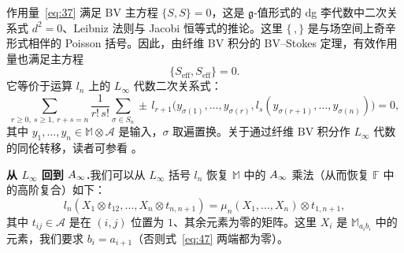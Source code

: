 作用量~\eqref{eq:37} 满足 BV 主方程 $\{S,S\}=0$，这是 $\mathfrak g$-值形式的 dg 李代数中二次关系式 $d^2=0$、Leibniz 法则与 Jacobi 恒等式的推论。这里 $\{\,,\}$ 是与场空间上奇辛形式相伴的 Poisson 括号。因此，由纤维 BV 积分的 BV--Stokes 定理，有效作用量也满足主方程
\begin{equation}\tag{45}\label{eq:45}
\{S_{\mathrm{eff}},S_{\mathrm{eff}}\}=0.
\end{equation}
它等价于运算 $l_n$ 上的 $L_\infty$ 代数二次关系式：
\begin{equation}\tag{46}\label{eq:46}
\sum_{r\ge0,\ s\ge1,\ r+s=n}\frac{1}{r!\,s!}\sum_{\sigma\in S_n}
\pm\,l_{r+1}\bigl(y_{\sigma(1)},\dots,y_{\sigma(r)},l_s(y_{\sigma(r+1)},\dots,y_{\sigma(n)})\bigr)=0,
\end{equation}
其中 $y_1,\dots,y_n\in\mathbb{M}\otimes\mathcal A$ 是输入，$\sigma$ 取遍置换。关于通过纤维 BV 积分作 $L_\infty$ 代数的同伦转移，读者可参看 \cite{mnev}。


\textbf{从 $L_\infty$ 回到 $A_\infty$.}\quad 我们可以从 $L_\infty$ 括号 $l_n$ 恢复 $\mathbb{M}$ 中的 $A_\infty$ 乘法（从而恢复 $\mathbb{F}$ 中的高阶复合）如下：
\begin{equation}\tag{47}\label{eq:47}
l_n(X_1\otimes t_{12},\dots,X_n\otimes t_{n,n+1})=\mu_n(X_1,\dots,X_n)\otimes t_{1,n+1},
\end{equation}
其中 $t_{ij}\in\mathcal A$ 是在 $(i,j)$ 位置为 $1$、其余元素为零的矩阵。这里 $X_i$ 是 $\mathbb{M}_{a_ib_i}$ 中的元素，我们要求 $b_i=a_{i+1}$（否则式~\eqref{eq:47} 两端都为零）。

\endinput
